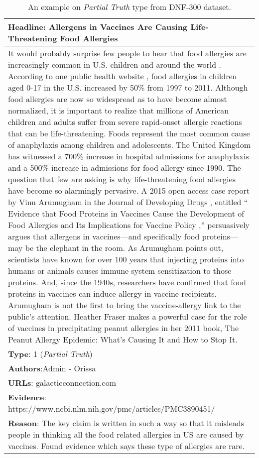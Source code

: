 \documentclass[11pt,a4paper]{article}
\begin{document}
\begin{table*}[t]
\centering
\begin{tabular}{p{15cm}}
\hline
\textbf{Headline}: Allergens in Vaccines Are Causing Life-Threatening Food Allergies\\
\hline 
It would probably surprise few people to hear that food allergies are increasingly common in U.S. children and around the world . According to one public health website , food allergies in children aged 0-17 in the U.S. increased by 50\% from 1997 to 2011. 
Although food allergies are now so widespread as to have become almost normalized, it is important to realize that millions of American children and adults suffer from severe rapid-onset allergic reactions that can be life-threatening. Foods represent the most common cause of anaphylaxis among children and adolescents. The United Kingdom has witnessed a 700\% increase in hospital admissions for anaphylaxis and a 500\% increase in admissions for food allergy since 1990. 
The question that few are asking is why life-threatening food allergies have become so alarmingly pervasive. A 2015 open access case report by Vinu Arumugham in the Journal of Developing Drugs , entitled `` Evidence that Food Proteins in Vaccines Cause the Development of Food Allergies and Its Implications for Vaccine Policy ,'' persuasively argues that allergens in vaccines—and specifically food proteins—may be the elephant in the room. 
As Arumugham points out, scientists have known for over 100 years that injecting proteins into humans or animals causes immune system sensitization to those proteins. And, since the 1940s, researchers have confirmed that food proteins in vaccines can induce allergy in vaccine recipients. Arumugham is not the first to bring the vaccine-allergy link to the public’s attention. Heather Fraser makes a powerful case for the role of vaccines in precipitating peanut allergies in her 2011 book, The Peanut Allergy Epidemic: What’s Causing It and How to Stop It.\\
\hline
\textbf{Type}: 1 (\textit{Partial Truth})\\
\textbf{Authors}:Admin - Orissa\\
\textbf{URLs}: galacticconnection.com\\
\hline
\textbf{Evidence}: https://www.ncbi.nlm.nih.gov/pmc/articles/PMC3890451/\\
\hline
\textbf{Reason}: The key claim is written in such a way so that it misleads people in thinking all the food related allergies in US are caused by vaccines. Found evidence which says these type of allergies are rare.\\
\hline
\end{tabular}
\caption{\label{tab:dnf300_partial}An example on \textit{Partial Truth} type from DNF-300 dataset. 
}
\end{table*}
\end{document}
